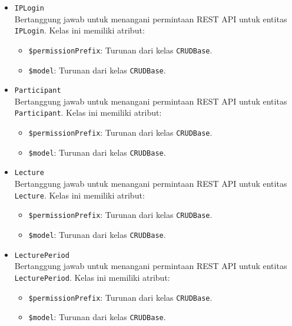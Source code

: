 \begin{itemize}
        \item \texttt{IPLogin}\\
            Bertanggung jawab untuk menangani permintaan REST API untuk entitas
            \texttt{IPLogin}. Kelas ini memiliki atribut:
            \begin{itemize}
                \item \texttt{\$permissionPrefix}: Turunan dari kelas
                \texttt{CRUDBase}.
                \item \texttt{\$model}: Turunan dari kelas \texttt{CRUDBase}.
            \end{itemize}
        
        \item \texttt{Participant}\\
            Bertanggung jawab untuk menangani permintaan REST API untuk entitas
            \texttt{Participant}. Kelas ini memiliki atribut:
            \begin{itemize}
                \item \texttt{\$permissionPrefix}: Turunan dari kelas
                \texttt{CRUDBase}.
                \item \texttt{\$model}: Turunan dari kelas \texttt{CRUDBase}.
            \end{itemize}
        
        \item \texttt{Lecture}\\
            Bertanggung jawab untuk menangani permintaan REST API untuk entitas
            \texttt{Lecture}. Kelas ini memiliki atribut:
            \begin{itemize}
                \item \texttt{\$permissionPrefix}: Turunan dari kelas
                \texttt{CRUDBase}.
                \item \texttt{\$model}: Turunan dari kelas \texttt{CRUDBase}.
            \end{itemize}
        
        \item \texttt{LecturePeriod}\\
            Bertanggung jawab untuk menangani permintaan REST API untuk entitas
            \texttt{LecturePeriod}. Kelas ini memiliki atribut:
            \begin{itemize}
                \item \texttt{\$permissionPrefix}: Turunan dari kelas
                \texttt{CRUDBase}.
                \item \texttt{\$model}: Turunan dari kelas \texttt{CRUDBase}.
            \end{itemize}
        

\end{itemize}
